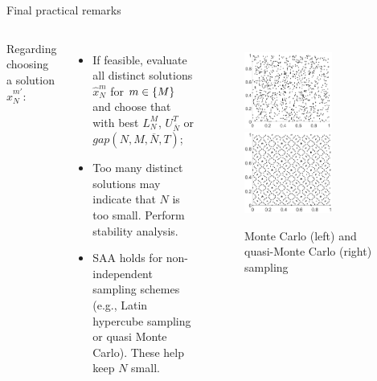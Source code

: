\begin{frame}{Final practical remarks}
	\begin{columns}
	Regarding choosing a solution $\hat{x}^{m'}_N$:
	\begin{itemize}
		\item If feasible, evaluate all distinct solutions $\hat{x}^{m}_N$ for $m \in \left\{ M \right \}$ and choose that with \alert{best} $L_N^M$, $U_{\overline{N}}^T$ or $gap(N,M,\overline{N},T)$;
		\item Too many \alert{distinct} solutions may indicate that $N$ is too \alert{small}. Perform stability analysis.
		\item SAA holds for \alert{non-independent} sampling schemes (e.g., Latin hypercube sampling or quasi Monte Carlo). These help keep $N$ small.
	\end{itemize}

	\vspace{-12pt}
	\begin{figure}
	    \centering
	    \includegraphics[width=0.65\textwidth]{figures/Monte_carlo.pdf}
		\includegraphics[width=0.65\textwidth]{figures/quasi_mc.pdf}	
		\caption{Monte Carlo (left) and quasi-Monte Carlo (right) sampling {\small \cite{fernandez2018optimizing}}}
	\end{figure}
		
	\end{columns}
	
\end{frame}



